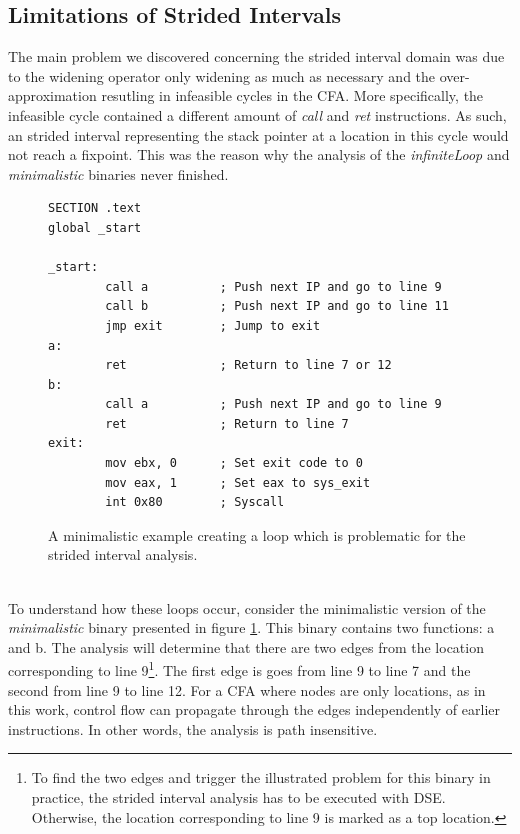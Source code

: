 \documentclass{kththesis}
\renewcommand{\it}[1]{\textit{#1}}
\begin{document}
\subsection{Limitations of Strided Intervals}\label{sec:nonZeroSum}
The main problem we discovered concerning the strided interval domain was due to the widening operator only widening as much as necessary and the over-approximation resutling in infeasible cycles in the CFA. More specifically, the infeasible cycle contained a different amount of \it{call} and \it{ret} instructions. As such, an strided interval representing the stack pointer at a location in this cycle would not reach a fixpoint. This was the reason why the analysis of the \it{infiniteLoop} and \it{minimalistic} binaries never finished.  
\begin{figure}[!ht]
    \centering
\begin{tcolorbox}
\begin{verbatim}
SECTION .text
global _start

_start:
        call a          ; Push next IP and go to line 9
        call b          ; Push next IP and go to line 11
        jmp exit        ; Jump to exit
a:            
        ret             ; Return to line 7 or 12
b: 
        call a          ; Push next IP and go to line 9
        ret             ; Return to line 7
exit:
        mov ebx, 0      ; Set exit code to 0
        mov eax, 1      ; Set eax to sys_exit
        int 0x80        ; Syscall
\end{verbatim}
\end{tcolorbox}
\caption{A minimalistic example creating a loop which is problematic for the strided interval analysis.}
    \label{fig:badLoop}
\end{figure}
\noindent
\\
To understand how these loops occur, consider the minimalistic version of the \it{minimalistic} binary presented in figure \ref{fig:badLoop}. This binary contains two functions: a and b. The analysis will determine that there are two edges from the location corresponding to line 9\footnote{To find the two edges and trigger the illustrated problem for this binary in practice, the strided interval analysis has to be executed with DSE. Otherwise, the location corresponding to line 9 is marked as a top location.}. The first edge is goes from line 9 to line 7 and the second from line 9 to line 12. For a CFA where nodes are only locations, as in this work, control flow can propagate through the edges independently of earlier instructions. In other words, the analysis is path insensitive.
\end{document}
